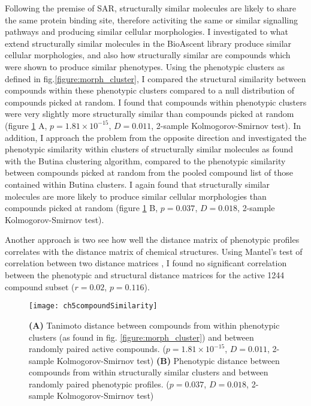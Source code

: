 \documentclass[a4paper,11pt,twoside,openright]{scrbook}
\begin{document}
Following the premise of SAR, structurally similar molecules are likely to share the same protein binding site, therefore activiting the same or similar signalling pathways and producing similar cellular morphologies.
I investigated to what extend structurally similar molecules in the BioAscent library produce similar cellular morphologies, and also how structurally similar are compounds which were shown to produce similar phenotypes.
Using the phenotypic clusters as defined in fig.\ref{figure:morph_cluster}, I compared the structural similarity between compounds within these phenotypic clusters compared to a null distribution of compounds picked at random.
I found that compounds within phenotypic clusters were very slightly more structurally similar than compounds picked at random (figure \ref{figure:compound_pheno_corr} A, $p=1.81\times10^{-15}$, $D=0.011$, 2-sample Kolmogorov-Smirnov test).
In addition, I approach the problem from the opposite direction and investigated the phenotypic similarity within clusters of structurally similar molecules as found with the Butina clustering algorithm, compared to the phenotypic similarity between compounds picked at random from the pooled compound list of those contained within Butina clusters.
I again found that structurally similar molecules are more likely to produce similar cellular morphologies than compounds picked at random (figure \ref{figure:compound_pheno_corr} B, $p=0.037$, $D=0.018$, 2-sample Kolmogorov-Smirnov test).

Another approach is two see how well the distance matrix of phenotypic profiles correlates with the distance matrix of chemical structures.
Using Mantel's test of correlation between two distance matrices \cite{Mantel1967}, I found no significant correlation between the phenotypic and structural distance matrices for the active 1244 compound subset ($r = 0.02$, $p = 0.116$).


\begin{figure}
    \captionsetup{width=0.8\textwidth}
    \caption[Comparison of structural and phenotypically similar compounds]{
        \textbf{(A)} Tanimoto distance between compounds from within phenotypic clusters (as found in fig. \ref{figure:morph_cluster}) and between randomly paired active compounds.
        ($p=1.81\times10^{-15}$, $D=0.011$, 2-sample Kolmogorov-Smirnov test)
    \textbf{(B)} Phenotypic distance between compounds from within structurally similar clusters and between randomly paired phenotypic profiles.
    ($p=0.037$, $D=0.018$, 2-sample Kolmogorov-Smirnov test)
}
    \texttt{[image: ch5compoundSimilarity]}
    \label{figure:compound_pheno_corr}
\end{figure}
\end{document}
